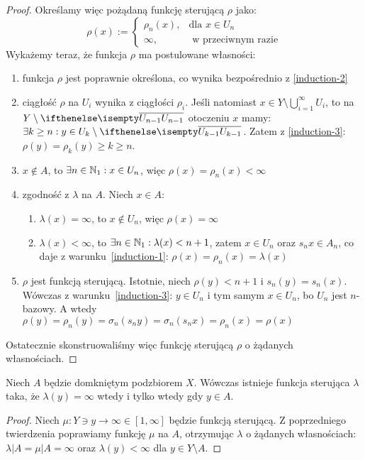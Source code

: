 \begin{thm}
\begin{proof}
  Określamy więc pożądaną funkcję sterującą $\rho$ jako:
  \[\rho(x) := 
    \begin{cases}
      \rho_n(x),&\mbox{dla } x \in U_n \\
      \infty,&\mbox{ w przeciwnym razie}
    \end{cases}
  \]
  Wykażemy teraz, że funkcja $\rho$ ma postulowane własności:
  \begin{enumerate}
   \item funkcja $\rho$ jest poprawnie określona, co wynika bezpośrednio z \ref{induction-2}
   \item ciągłość $\rho$ na $U_i$ wynika z ciągłości $\rho_i$. Jeśli natomiast $x\in Y\setminus\bigcup_{i=1}^\infty U_i$, to na $Y\setminus\cl{U_{n-1}}$ otoczeniu $x$ mamy: $\exists k\geq n: y\in U_{k} \setminus \cl{U_{k-1}}$. Zatem z \ref{induction-3}: $\rho(y) = \rho_k(y) \geq k \geq n$.
   \item $x\not\in A$, to $\exists n\in{\mathbb{N}_1}: x\in U_n$, więc $\rho(x) = \rho_n(x) < \infty$
   \item zgodność z $\lambda$ na $A$. Niech $x\in A$:
   \begin{enumerate}[1$^\circ$]
    \item $\lambda(x) = \infty$, to $x\not\in U_n$, więc $\rho(x) = \infty$
    \item $\lambda(x) < \infty$, to $\exists n\in{\mathbb{N}_1}: \lambda(x) < n+1$, zatem $x \in U_n$ oraz $s_n x\in A_n$, co daje z warunku~\ref{induction-1}: $\rho(x) = \rho_n(x) = \lambda(x)$
   \end{enumerate}
   \item $\rho$ jest funkcją sterującą. Istotnie, niech $\rho(y) < n+1$ i $s_n(y) = s_n(x)$. Wówczas z warunku~\ref{induction-3}: $y \in U_n$ i tym samym $x \in U_n$, bo $U_n$ jest $n$-bazowy. A wtedy $\rho(y) = \rho_n(y) = \sigma_n(s_n y) = \sigma_n(s_n x) = \rho_n(x) = \rho(x)$
  \end{enumerate}
  
  Ostatecznie skonstruowaliśmy więc funkcję sterującą $\rho$ o żądanych własnościach.
\end{proof}
\end{thm}


\begin{cor} \label{cor:steering-finite}
  Niech $A$ będzie domkniętym podzbiorem $X$. Wówczas istnieje funkcja sterująca $\lambda$ taka, że $\lambda(y) = \infty$ wtedy i tylko wtedy gdy $y \in A$.
  
  \begin{proof}
    Niech $\mu: Y \ni y \rightarrow \infty \in [1, \infty]$ będzie funkcją sterującą. Z poprzedniego twierdzenia poprawiamy funkcję $\mu$ na $A$, otrzymując $\lambda$ o żądanych własnościach: $\lambda|A = \mu|A = \infty$ oraz $\lambda(y) < \infty$ dla $y \in Y \setminus A$.
  \end{proof}
\end{cor}

